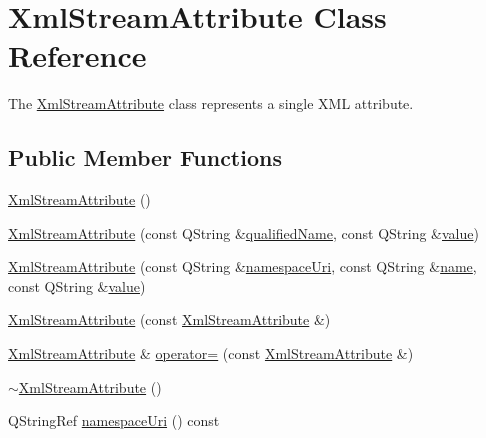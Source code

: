 \hypertarget{class_xml_stream_attribute}{}\section{Xml\+Stream\+Attribute Class Reference}
\label{class_xml_stream_attribute}


The \hyperlink{class_xml_stream_attribute}{Xml\+Stream\+Attribute} class represents a single X\+ML attribute.  


\subsection*{Public Member Functions}
\begin{DoxyCompactItemize}
\item 
\hyperlink{class_xml_stream_attribute_aa5f200993700468c044eadc4ce7ae89f}{Xml\+Stream\+Attribute} ()
\item 
\hyperlink{class_xml_stream_attribute_aa6fb4b0b8a1b67e82eb96f1ca18433a0}{Xml\+Stream\+Attribute} (const Q\+String \&\hyperlink{class_xml_stream_attribute_acc21c4ce8b0539d6c1131ab789171dd9}{qualified\+Name}, const Q\+String \&\hyperlink{class_xml_stream_attribute_a0cd7ec6aa7531c411ed20a354c2e7f24}{value})
\item 
\hyperlink{class_xml_stream_attribute_a266b1754effadd2f2388969a27cf91a2}{Xml\+Stream\+Attribute} (const Q\+String \&\hyperlink{class_xml_stream_attribute_adf6da78e3783c50df9ce1d950e0b94c8}{namespace\+Uri}, const Q\+String \&\hyperlink{class_xml_stream_attribute_a2053ea2d13de7262dac760788ed8265f}{name}, const Q\+String \&\hyperlink{class_xml_stream_attribute_a0cd7ec6aa7531c411ed20a354c2e7f24}{value})
\item 
\hyperlink{class_xml_stream_attribute_a14fa3927c8ba018070ab4edbdef2f638}{Xml\+Stream\+Attribute} (const \hyperlink{class_xml_stream_attribute}{Xml\+Stream\+Attribute} \&)
\item 
\hyperlink{class_xml_stream_attribute}{Xml\+Stream\+Attribute} \& \hyperlink{class_xml_stream_attribute_a7d455c18b5d261f261523752e9d39b98}{operator=} (const \hyperlink{class_xml_stream_attribute}{Xml\+Stream\+Attribute} \&)
\item 
\hyperlink{class_xml_stream_attribute_a0790a80f54d9bb1dba7ce5f230ff3b61}{$\sim$\+Xml\+Stream\+Attribute} ()
\item 
Q\+String\+Ref \hyperlink{class_xml_stream_attribute_adf6da78e3783c50df9ce1d950e0b94c8}{namespace\+Uri} () const
\item 

\end{DoxyCompactItemize}
